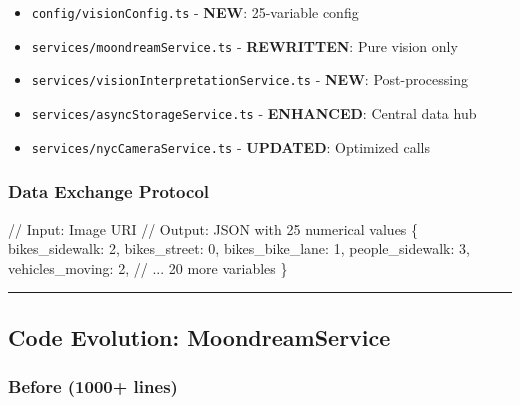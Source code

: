 \documentclass[
  letterpaper,
  DIV=11,
  numbers=noendperiod]{scrartcl}
\newenvironment{Shaded}{\begin{snugshade}}{\end{snugshade}}
\newcommand{\CommentTok}[1]{\textcolor[rgb]{0.37,0.37,0.37}{#1}}
\newcommand{\DecValTok}[1]{\textcolor[rgb]{0.68,0.00,0.00}{#1}}
\newcommand{\NormalTok}[1]{\textcolor[rgb]{0.00,0.23,0.31}{#1}}
\newcommand{\OperatorTok}[1]{\textcolor[rgb]{0.37,0.37,0.37}{#1}}
\providecommand{\tightlist}{%
  \setlength{\itemsep}{0pt}\setlength{\parskip}{0pt}}
\begin{document}
\begin{itemize}
\tightlist
\item
  \texttt{config/visionConfig.ts} - \textbf{NEW}: 25-variable config
\item
  \texttt{services/moondreamService.ts} - \textbf{REWRITTEN}: Pure
  vision only
\item
  \texttt{services/visionInterpretationService.ts} - \textbf{NEW}:
  Post-processing
\item
  \texttt{services/asyncStorageService.ts} - \textbf{ENHANCED}: Central
  data hub
\item
  \texttt{services/nycCameraService.ts} - \textbf{UPDATED}: Optimized
  calls
\end{itemize}

\subsubsection{Data Exchange Protocol}\label{data-exchange-protocol}

\begin{Shaded}
\begin{Highlighting}[]
\CommentTok{// Input: Image URI}
\CommentTok{// Output: JSON with 25 numerical values}
\NormalTok{\{}
\NormalTok{  bikes\_sidewalk}\OperatorTok{:} \DecValTok{2}\OperatorTok{,}
\NormalTok{  bikes\_street}\OperatorTok{:} \DecValTok{0}\OperatorTok{,}
\NormalTok{  bikes\_bike\_lane}\OperatorTok{:} \DecValTok{1}\OperatorTok{,}
\NormalTok{  people\_sidewalk}\OperatorTok{:} \DecValTok{3}\OperatorTok{,}
\NormalTok{  vehicles\_moving}\OperatorTok{:} \DecValTok{2}\OperatorTok{,}
  \CommentTok{// ... 20 more variables}
\NormalTok{\}}
\end{Highlighting}
\end{Shaded}

\begin{center}\rule{0.5\linewidth}{0.5pt}\end{center}

\subsection{Code Evolution:
MoondreamService}\label{code-evolution-moondreamservice}

\subsubsection{Before (1000+ lines)}\label{before-1000-lines}
\end{document}
